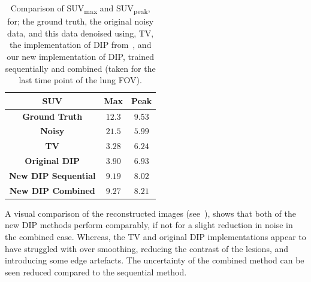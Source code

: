         \begin{table}
            \centering
            
            \captionsetup{singlelinecheck=false, justification=centering}
            \caption{
            Comparison of \gls{SUV}\textsubscript{max} and \gls{SUV}\textsubscript{peak}, for; the ground truth, the original noisy data, and this data denoised using, \gls{TV}, the implementation of \gls{DIP} from~\parencite{Gong2019PETPrior}, and our new implementation of \gls{DIP}, trained sequentially and combined (taken for the last time point of the lung \gls{FOV}).}
            
            \resizebox*{1.0\linewidth}{!}
            {
                \begin{tabular}{||c|cc||}
                    \hline
                    \textbf{SUV}                & \textbf{Max}  & \textbf{Peak} \\
                    \hline
                    \textbf{Ground Truth}       & $12.3$        & $9.53$ \\
                    \hline
                    \textbf{Noisy}              & $21.5$        & $5.99$ \\
                    \hline
                    \textbf{TV}                 & $3.28$        & $6.24$ \\
                    \textbf{Original DIP}       & $3.90$        & $6.93$ \\
                    \hline
                    \textbf{New DIP Sequential} & $9.19$        & $8.02$ \\
                    \textbf{New DIP Combined}   & $9.27$        & $8.21$ \\
                    \hline
                \end{tabular}
            }
            \label{tab:pseudo_bayesian_dip_denoising_as_a_preprocessing_step_for_kinetic_modelling_in_dynamic_pet_appendix_results_suv}
        \end{table}
        
        A visual comparison of the reconstructed images (see~), shows that both of the new \gls{DIP} methods perform comparably, if not for a slight reduction in noise in the combined case. Whereas, the \gls{TV} and original \gls{DIP} implementations appear to have struggled with over smoothing, reducing the contrast of the lesions, and introducing some edge artefacts. The uncertainty of the combined method can be seen reduced compared to the sequential method.
        
